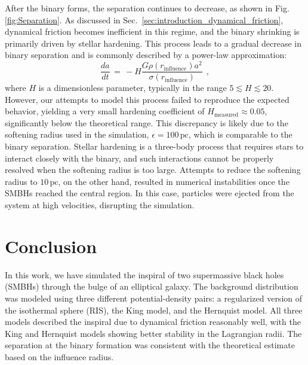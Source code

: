\documentclass[fleqn,usenatbib]{mnras}
\begin{document}
After the binary forms, the separation continues to decrease, as shown in Fig. \ref{fig:Separation}.
As discussed in Sec.~\ref{sec:introduction_dynamical_friction}, dynamical friction becomes inefficient in this regime, and the binary shrinking is primarily driven by stellar hardening.
This process leads to a gradual decrease in binary separation and is commonly described by a power-law approximation:
\begin{equation}
    \dfrac{da}{dt} \, = \, - H \dfrac{G \rho(r_\text{influence}) a^2}{\sigma(r_\text{influence})} \:\: ,
    \label{eq:hardening}
\end{equation}
where $H$ is a dimensionless parameter, typically in the range $5 \lesssim H \lesssim 20$.
However, our attempts to model this process failed to reproduce the expected behavior, yielding a very small hardening coefficient  of $H_\text{measured} \approx 0.05$, significantly below the theoretical range.
This discrepancy is likely due to the softening radius used in the simulation, $\epsilon = 100 \,\text{pc}$, which is comparable to the binary separation.
Stellar hardening is a three-body process that requires stars to interact closely with the binary, and such interactions cannot be properly resolved when the softening radius is too large.
Attempts to reduce the softening radius to $10 \,\text{pc}$, on the other hand, resulted in numerical instabilities once the SMBHs reached the central region. In this case, particles were ejected from the system at high velocities, disrupting the simulation.



\section{Conclusion}\label{sec:conclusion}
In this work, we have simulated the inspiral of two supermassive black holes (SMBHs) through the bulge of an elliptical galaxy.
The background distribution was modeled using three different potential-density pairs: a regularized version of the isothermal sphere (RIS), the King model, and the Hernquist model.
All three models described the inspiral due to dynamical friction reasonably well, with the King and Hernquist models showing better stability in the Lagrangian radii.
The separation at the binary formation was consistent with the theoretical estimate based on the influence radius.
\end{document}
